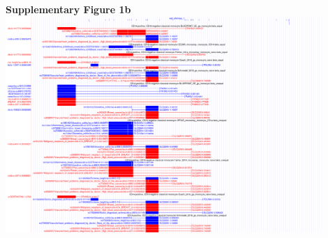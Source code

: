 \begin{minipage}{1.6\textwidth}


        \textbf{Supplementary Figure 1b}
        \\
        \includegraphics[width=0.9\textwidth]{fig/ucsc_gwas2eqtl_il4_monocyte.png}
%

\end{minipage}


